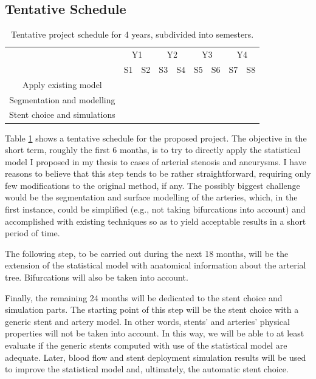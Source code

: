 \documentclass[a4paper]{article}
\begin{document}
\subsection{Tentative Schedule}

\begin{table}[h]\centering
\begin{tabular}{c|c|c|c|c|c|c|c|c|}
\cline{2-9}
 & \multicolumn{2}{|c|}{Y1} & \multicolumn{2}{|c|}{Y2} & \multicolumn{2}{|c|}{Y3} & \multicolumn{2}{|c|}{Y4} \\ \cline{2-9}
 & S1 & S2 & S3 & S4 & S5 & S6 & S7 & S8  \\ \hline
\multicolumn{1}{|c|}{Apply existing model} & \cellcolor{green} & & & & & & & \\ \hline
\multicolumn{1}{|c|}{Segmentation and modelling} & & \cellcolor{green} & \cellcolor{green} & \cellcolor{green} & & & & \\ \hline
\multicolumn{1}{|c|}{Stent choice and simulations} & & & & & \cellcolor{green} & \cellcolor{green} & \cellcolor{green} & \cellcolor{green} \\ \hline
\end{tabular}
\caption{Tentative project schedule for 4 years, subdivided into semesters.}
\label{tab:schedule}
\end{table}

Table \ref{tab:schedule} shows a tentative schedule for the proposed project. The objective in the short term, roughly the first 6 months, is to try to directly apply the statistical model I proposed in my thesis to cases of arterial stenosis and aneurysms. I have reasons to believe that this step tends to be rather straightforward, requiring only few modifications to the original method, if any. The possibly biggest challenge would be the segmentation and surface modelling of the arteries, which, in the first instance, could be simplified (e.g., not taking bifurcations into account) and accomplished with existing techniques so as to yield acceptable results in a short period of time. 

The following step, to be carried out during the next 18 months, will be the extension of the statistical model with anatomical information about the arterial tree. Bifurcations will also be taken into account. 

Finally, the remaining 24 months will be dedicated to the stent choice and simulation parts. The starting point of this step will be the stent choice with a generic stent and artery model. In other words, stents' and arteries' physical properties will not be taken into account. In this way, we will be able to at least evaluate if the generic stents computed with use of the statistical model are adequate. Later, blood flow and stent deployment simulation results will be used to improve the statistical model and, ultimately, the automatic stent choice.  
\end{document}
